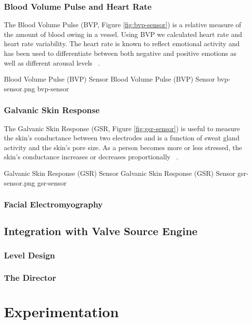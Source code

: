\documentclass{uofsthesis-cs}
\begin{document}
\subsection{Blood Volume Pulse and Heart Rate}
The Blood Volume Pulse (BVP, Figure \ref{fig:bvp-sensor}) is a relative measure of the amount of blood owing in a vessel. Using BVP we calculated heart rate and heart rate variability. The heart rate is known to reflect emotional activity and has been used to differentiate between both negative and positive emotions as well as different arousal levels ~\cite{tt2013procomp}.

\img
{Blood Volume Pulse (BVP) Sensor}
{Blood Volume Pulse (BVP) Sensor}
{bvp-sensor.png}
{bvp-sensor}

\subsection{Galvanic Skin Response}
The Galvanic Skin Response (GSR, Figure \ref{fig:gsr-sensor}) is useful to measure the skin's conductance between two electrodes and is a function of sweat gland activity and the skin's pore size. As a person becomes more or less stressed, the skin's conductance increases or decreases proportionally ~\cite{picard2003affective}.

\img
{Galvanic Skin Response (GSR) Sensor}
{Galvanic Skin Response (GSR) Sensor}
{gsr-sensor.png}
{gsr-sensor}

\subsection{Facial Electromyography}


\section{Integration with Valve Source Engine}
\subsection{Level Design}
\subsection{The Director}



\chapter{Experimentation}
\label{chap:exprm}
\end{document}
